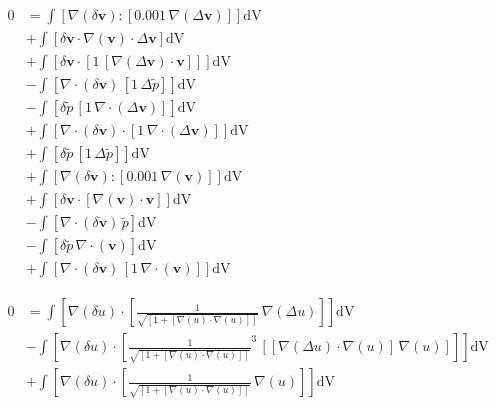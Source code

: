 \documentclass[preview,varwidth,multi,border=1pt]{standalone}
\begin{document}
\newpage

\preview
$\begin{aligned}
0 &= \int\left[\nabla\left(\delta{\mathbf{v}}\right) \colon \left[{0.001}\,\nabla\left(\Delta{\mathbf{v}}\right)\right]\right]\textrm{dV} \\
  &+ \int\left[\delta{\mathbf{v}} \cdot \nabla\left({\mathbf{v}}\right) \cdot \Delta{\mathbf{v}}\right]\textrm{dV} \\
  &+ \int\left[\delta{\mathbf{v}} \cdot \left[{1}\,\left[\nabla\left(\Delta{\mathbf{v}}\right) \cdot {\mathbf{v}}\right]\right]\right]\textrm{dV} \\
  &- \int\left[\nabla \cdot\left(\delta{\mathbf{v}}\right)\,\left[{1}\,\Delta{\tilde{p}}\right]\right]\textrm{dV} \\
  &- \int\left[\delta{\tilde{p}}\,\left[{1}\,\nabla \cdot\left(\Delta{\mathbf{v}}\right)\right]\right]\textrm{dV} \\
  &+ \int\left[\nabla \cdot\left(\delta{\mathbf{v}}\right) \cdot \left[{1}\,\nabla \cdot\left(\Delta{\mathbf{v}}\right)\right]\right]\textrm{dV} \\
  &+ \int\left[\delta{\tilde{p}}\,\left[{1}\,\Delta{\tilde{p}}\right]\right]\textrm{dV} \\
  &+ \int\left[\nabla\left(\delta{\mathbf{v}}\right) \colon \left[{0.001}\,\nabla\left({\mathbf{v}}\right)\right]\right]\textrm{dV} \\
  &+ \int\left[\delta{\mathbf{v}} \cdot \left[\nabla\left({\mathbf{v}}\right) \cdot {\mathbf{v}}\right]\right]\textrm{dV} \\
  &- \int\left[\nabla \cdot\left(\delta{\mathbf{v}}\right)\,{\tilde{p}}\right]\textrm{dV} \\
  &- \int\left[\delta{\tilde{p}}\,\nabla \cdot\left({\mathbf{v}}\right)\right]\textrm{dV} \\
  &+ \int\left[\nabla \cdot\left(\delta{\mathbf{v}}\right)\,\left[{1}\,\nabla \cdot\left({\mathbf{v}}\right)\right]\right]\textrm{dV}
\end{aligned}$
\endpreview

\newpage

\preview
$\begin{aligned}
0 &= \int\left[\nabla\left(\delta{u}\right) \cdot \left[\frac{{1}}{\sqrt{\left[{1} + \left[\nabla\left({u}\right) \cdot \nabla\left({u}\right)\right]\right]}}\,\nabla\left(\Delta{u}\right)\right]\right]\textrm{dV} \\
  &- \int\left[\nabla\left(\delta{u}\right) \cdot \left[{\frac{{1}}{\sqrt{\left[{1} + \left[\nabla\left({u}\right) \cdot \nabla\left({u}\right)\right]\right]}}}^{{3}}\,\left[\left[\nabla\left(\Delta{u}\right) \cdot \nabla\left({u}\right)\right]\,\nabla\left({u}\right)\right]\right]\right]\textrm{dV} \\
  &+ \int\left[\nabla\left(\delta{u}\right) \cdot \left[\frac{{1}}{\sqrt{\left[{1} + \left[\nabla\left({u}\right) \cdot \nabla\left({u}\right)\right]\right]}}\,\nabla\left({u}\right)\right]\right]\textrm{dV}
\end{aligned}$
\endpreview
\end{document}
